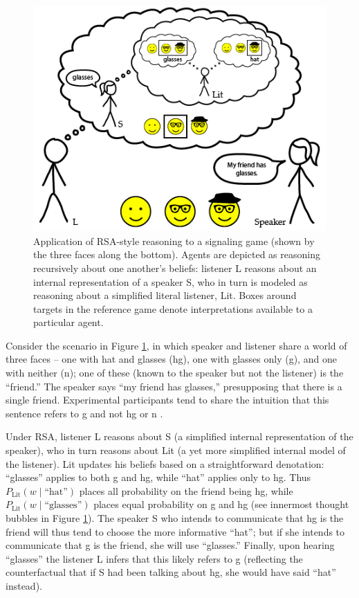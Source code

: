 \documentclass[]{elsarticle}
\begin{document}
\begin{figure}[t]
\begin{center}
\includegraphics[width=1.0\textwidth]{images/media/image02.png}
\caption{\label{fig:hg} Application of RSA-style reasoning to a signaling
game (shown by the three faces along the bottom). Agents are depicted as reasoning recursively about one another's beliefs: listener L reasons about an internal representation of a speaker S, who in turn is modeled as reasoning about a simplified literal listener, Lit. Boxes around targets in the reference game denote interpretations available to a particular agent.}
\end{center}
\end{figure}

Consider the scenario in Figure \ref{fig:hg}, in which speaker and listener share a
world of three faces -- one with hat and glasses ({\sc hg}), one with glasses
only ({\sc g}), and one with neither ({\sc n}); one of these (known to the speaker
but not the listener) is the ``friend.'' The speaker says ``my friend
has glasses,'' presupposing that there is a single friend. Experimental participants tend to share the intuition that this sentence refers to {\sc g} and not {\sc hg} or {\sc n} \citep{stiller2011,stiller2015}.

Under RSA, listener L reasons about S (a simplified
internal representation of the speaker), who in turn reasons about Lit
(a yet more simplified internal model of the listener). Lit updates his
beliefs based on a straightforward denotation: ``glasses'' applies to
both {\sc g} and {\sc hg}, while ``hat'' applies only to {\sc hg}. Thus
$P_{\text{Lit}}(w\mid \text{``hat''})$ places all probability on the friend
being {\sc hg}, while $P_{\text{Lit}}(w\mid \text{``glasses''})$ places equal probability on {\sc g} and {\sc hg} (see innermost thought bubbles in Figure \ref{fig:hg}). The speaker S who intends to communicate that {\sc hg} is the friend will thus tend to choose the more informative ``hat''; but if she intends to communicate that {\sc g} is the friend, she will use ``glasses.'' Finally, upon hearing ``glasses'' the listener L infers that this likely refers to {\sc g} (reflecting the counterfactual that if S had been talking about {\sc hg}, she would have said ``hat'' instead).
\end{document}
